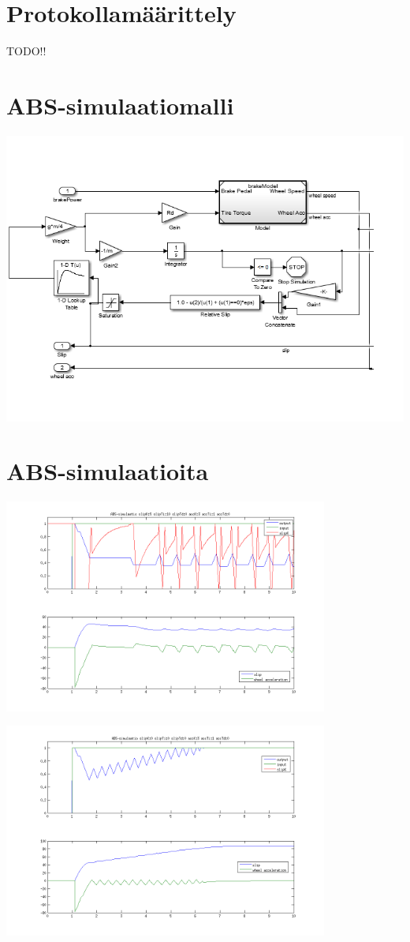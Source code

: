 \documentclass{article}
\newcommand{\kuvaa}[4]{%
	\begin{figure}[h]%
		\centering \texttt{[image: \#2]}%
		\caption{#3 \label{fig:#4}}%
	\end{figure}%
}
\begin{document}
\begin{appendices}
\section{Protokollamäärittely}
TODO!!

\section{ABS-simulaatiomalli} \label{app:simmodel}
\centering \includegraphics[width=1.0\textwidth]{qrtVehMdl}

\section{ABS-simulaatioita} \label{app:abssim}
\centering \includegraphics[width=0.8\textwidth]{abssim1}

\centering \includegraphics[width=0.8\textwidth]{abssim2}


\end{appendices}
\end{document}
